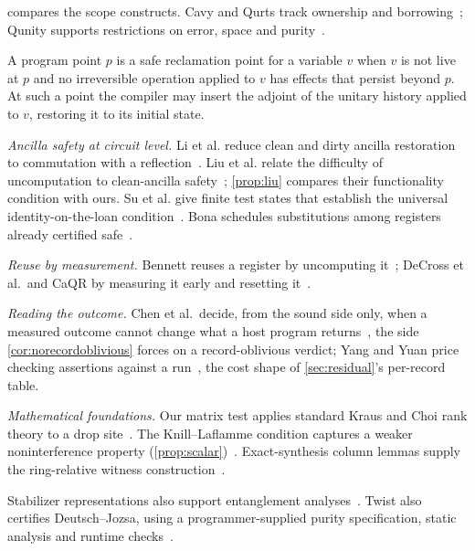 \documentclass[acmsmall,screen,review,anonymous,nonacm]{acmart}
\begin{document}
 compares the scope constructs. Cavy and Qurts
track ownership and borrowing~\cite{McNally2021Cavy,Hirata2025Qurts};
Qunity supports restrictions on error, space and purity~\cite{Voichick2023Qunity}.

\begin{fact}
A program point $p$ is a safe reclamation point for a variable $v$ when $v$
is not live at $p$ and no irreversible operation applied to $v$ has effects
that persist beyond $p$. At such a point the compiler may insert the adjoint
of the unitary history applied to $v$, restoring it to its initial state.
\end{fact}

\emph{Ancilla safety at circuit level.} Li et al. reduce clean and dirty ancilla
restoration to commutation with a reflection~\cite{Li2026AncillaSafety}.
Liu et al. relate the difficulty of uncomputation to clean-ancilla
safety~\cite[Prop.~3.3]{Liu2026Uncomputation}; \cref{prop:liu} compares
their functionality condition with ours. Su et al. give finite test
states that establish the universal identity-on-the-loan
condition~\cite{Su2025Borrowing}. Bona schedules substitutions among
registers already certified safe~\cite{Xu2026Bona}.

\emph{Reuse by measurement.} Bennett reuses a register by uncomputing
it~\cite{Bennett1973Logical,Bennett1989TimeSpace}; DeCross et al.\ and CaQR
by measuring it early and resetting it~\cite{DeCross2023QubitReuse,Hua2023CaQR}.

\emph{Reading the outcome.} Chen et al.\ decide, from the sound side
only, when a measured outcome cannot change what a host program
returns~\cite{Chen2026DeadMeasurement}, the side \cref{cor:norecordoblivious} forces
on a record-oblivious verdict; Yang and Yuan price checking assertions
against a run~\cite{Yang2026Assertions}, the cost shape of
\cref{sec:residual}'s per-record table.

\emph{Mathematical foundations.} Our matrix test applies standard
Kraus and Choi rank theory to a drop site~\cite{Kraus1983States,Choi1975CP,Watrous2018TQI}.
The Knill--Laflamme condition captures a weaker noninterference
property (\cref{prop:scalar})~\cite{Knill1997Theory,Goguen1982Security,Ying2013Noninterference}.
Exact-synthesis column lemmas supply the ring-relative witness
construction~\cite{Giles2013ExactSynthesis,Amy2020Restricted}.

Stabilizer representations also support entanglement
analyses~\cite{Honda2015Stabilizer,Perdrix2008Entanglement,Assolini2025Entanglement}.
Twist also certifies Deutsch--Jozsa, using a programmer-supplied purity
specification, static analysis and runtime checks~\cite[\S9]{Yuan2022Twist}.
\end{document}
